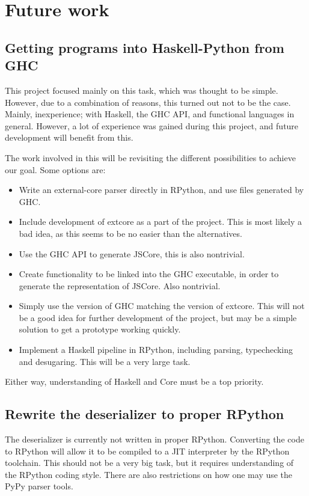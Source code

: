 \section{Future work}

\subsection{Getting programs into Haskell-Python from GHC}

This project focused mainly on this task, which was thought to be simple.
However, due to a combination of reasons, this turned out not to be the case.
Mainly, inexperience; with Haskell, the GHC API, and functional languages in 
general. However, a lot of experience was gained during this project, and
future development will benefit from this.

The work involved in this will be revisiting the different possibilities to
achieve our goal. Some options are:

\begin{itemize}
\item Write an external-core parser directly in RPython, and use files generated by GHC.
\item Include development of extcore as a part of the project. This is most likely a bad
idea, as this seems to be no easier than the alternatives.
\item Use the GHC API to generate JSCore, this is also nontrivial.
\item Create functionality to be linked into the GHC executable, in order to generate the
representation of JSCore. Also nontrivial.
\item Simply use the version of GHC matching the version of extcore. This will not be
a good idea for further development of the project, but may be a simple solution to get
a prototype working quickly.
\item Implement a Haskell pipeline in RPython, including parsing, typechecking and desugaring.
This will be a very large task.
\end{itemize}

Either way, understanding of Haskell and Core must be a top priority.

\subsection{Rewrite the deserializer to proper RPython}

The deserializer is currently not written in proper RPython. 
Converting the code to RPython will allow it to be compiled to a JIT interpreter by
the RPython toolchain. This should not be a very big task, but it requires understanding
of the RPython coding style. There are also restrictions on how one may use the PyPy parser
tools.

